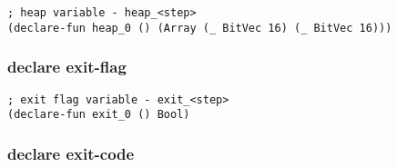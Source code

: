\begin{algorithm}[H]
\end{algorithm}

\begin{algorithm}[H]
\end{algorithm}

\begin{lstlisting}[language=SMTLib]
; heap variable - heap_<step>
(declare-fun heap_0 () (Array (_ BitVec 16) (_ BitVec 16)))
\end{lstlisting}

\subsubsection{declare exit-flag}

\begin{algorithm}[H]
\end{algorithm}

\begin{algorithm}[H]
\end{algorithm}

\begin{lstlisting}[language=SMTLib]
; exit flag variable - exit_<step>
(declare-fun exit_0 () Bool)
\end{lstlisting}

\subsubsection{declare exit-code}

\begin{algorithm}[H]
\end{algorithm}

\begin{algorithm}[H]
  \Fn{\DeclareExitCode{}}{
    \Formula \Append \DeclareBool{\ExitCodeVar{}} \Append \EOL \Append \EOL\;
  }
\end{algorithm}

